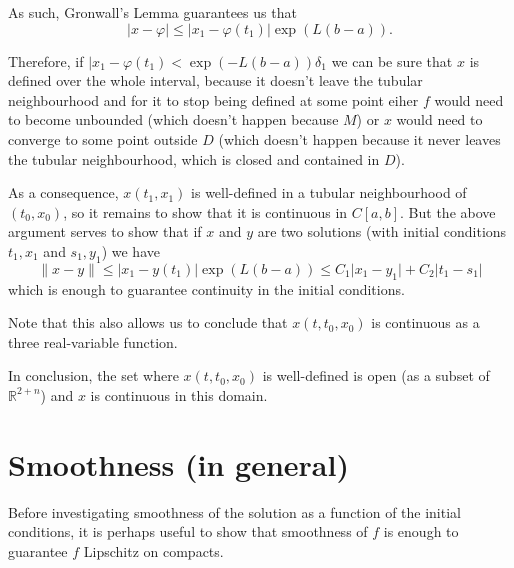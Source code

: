 \documentclass{article}
\newcommand{\R}{\mathbb{R}}
\begin{document}
As such, Gronwall's Lemma guarantees us that
\[\lvert x - \varphi \rvert \leq \lvert x_1 - \varphi(t_1) \rvert \exp(L(b-a)).\]

Therefore, if $\lvert x_1 - \varphi(t_1) < \exp(-L(b-a)) \delta_1$ we can be sure that $x$ is defined over the whole interval, because it doesn't leave the tubular neighbourhood and for it to stop being defined at some point eiher $f$ would need to become unbounded (which doesn't happen because $M$) or $x$ would need to converge to some point outside $D$ (which doesn't happen because it never leaves the tubular neighbourhood, which is closed and contained in $D$).

As a consequence, $x(t_1, x_1)$ is well-defined in a tubular neighbourhood of $(t_0, x_0)$, so it remains to show that it is continuous in $C[a,b]$. But the above argument serves to show that if $x$ and $y$ are two solutions (with initial conditions $t_1, x_1$ and $s_1, y_1$) we have
\[\lVert x - y \rVert \leq \lvert x_1 - y(t_1) \rvert \exp(L(b-a)) \leq C_1 \lvert x_1 - y_1 \rvert + C_2 \lvert t_1 - s_1 \rvert\]
which is enough to guarantee continuity in the initial conditions.

Note that this also allows us to conclude that $x(t,t_0,x_0)$ is continuous as a three real-variable function.

In conclusion, the set where $x(t,t_0,x_0)$ is well-defined is open (as a subset of $\R^{2+n}$) and $x$ is continuous in this domain.

\section{Smoothness (in general)}

Before investigating smoothness of the solution as a function of the initial conditions, it is perhaps useful to show that smoothness of $f$ is enough to guarantee $f$ Lipschitz on compacts.
\end{document}
